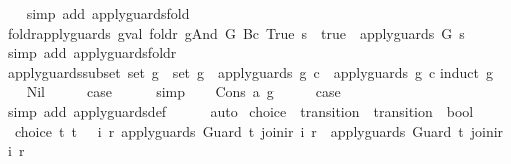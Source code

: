 \begin{isabellebody}
%
\isadelimproof
\ \ %
\endisadelimproof
%
\isatagproof
{}\isamarkupfalse%
\ {\isacharparenleft}simp\ add{\isacharcolon}\ apply{\isacharunderscore}guards{\isacharunderscore}fold{\isacharparenright}%
\endisatagproof
{\isafoldproof}%
%
\isadelimproof
\isanewline
%
\endisadelimproof
\isanewline
{}\isamarkupfalse%
\ foldr{\isacharunderscore}apply{\isacharunderscore}guards{\isacharcolon}\ {\isachardoublequoteopen}{\isacharparenleft}gval\ {\isacharparenleft}foldr\ gAnd\ G\ {\isacharparenleft}Bc\ True{\isacharparenright}{\isacharparenright}\ s\ {\isacharequal}\ true{\isacharparenright}\ {\isacharequal}\ apply{\isacharunderscore}guards\ G\ s{\isachardoublequoteclose}\isanewline
%
\isadelimproof
\ \ %
\endisadelimproof
%
\isatagproof
{}\isamarkupfalse%
\ {\isacharparenleft}simp\ add{\isacharcolon}\ apply{\isacharunderscore}guards{\isacharunderscore}foldr{\isacharparenright}%
\endisatagproof
{\isafoldproof}%
%
\isadelimproof
\isanewline
%
\endisadelimproof
\isanewline
{}\isamarkupfalse%
\ apply{\isacharunderscore}guards{\isacharunderscore}subset{\isacharcolon}\ {\isachardoublequoteopen}set\ g{\isacharprime}\ {\isasymsubseteq}\ set\ g\ {\isasymLongrightarrow}\ apply{\isacharunderscore}guards\ g\ c\ {\isasymlongrightarrow}\ apply{\isacharunderscore}guards\ g{\isacharprime}\ c{\isachardoublequoteclose}\isanewline
%
\isadelimproof
%
\endisadelimproof
%
\isatagproof
{}\isamarkupfalse%
{\isacharparenleft}induct\ g{\isacharparenright}\isanewline
\ \ \isamarkupfalse%
\ Nil\isanewline
\ \ \isamarkupfalse%
\ \isamarkupfalse%
\ {\isacharquery}case\isanewline
\ \ \ \ \isamarkupfalse%
\ simp\isanewline
{}\isamarkupfalse%
\isanewline
\ \ \isamarkupfalse%
\ {\isacharparenleft}Cons\ a\ g{\isacharparenright}\isanewline
\ \ \isamarkupfalse%
\ \isamarkupfalse%
\ {\isacharquery}case\isanewline
\ \ \ \ \isamarkupfalse%
\ {\isacharparenleft}simp\ add{\isacharcolon}\ apply{\isacharunderscore}guards{\isacharunderscore}def{\isacharparenright}\isanewline
\ \ \ \ \isamarkupfalse%
\ auto\isanewline
{}\isamarkupfalse%
%
\endisatagproof
{\isafoldproof}%
%
\isadelimproof
\isanewline
%
\endisadelimproof
\isanewline
{}\isamarkupfalse%
\ choice\ {\isacharcolon}{\isacharcolon}\ {\isachardoublequoteopen}transition\ {\isasymRightarrow}\ transition\ {\isasymRightarrow}\ bool{\isachardoublequoteclose}\ \isanewline
\ \ {\isachardoublequoteopen}choice\ t\ t{\isacharprime}\ {\isacharequal}\ {\isacharparenleft}{\isasymexists}\ i\ r{\isachardot}\ apply{\isacharunderscore}guards\ {\isacharparenleft}Guard\ t{\isacharparenright}\ {\isacharparenleft}join{\isacharunderscore}ir\ i\ r{\isacharparenright}\ {\isasymand}\ apply{\isacharunderscore}guards\ {\isacharparenleft}Guard\ t{\isacharprime}{\isacharparenright}\ {\isacharparenleft}join{\isacharunderscore}ir\ i\ r{\isacharparenright}{\isacharparenright}{\isachardoublequoteclose}\isanewline

\end{isabellebody}
